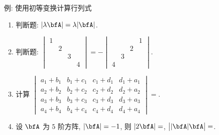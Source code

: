 \begin{frame}{例: 使用初等变换计算行列式}
	\onslide<+->
	\begin{exercise}
		\begin{enumerate}
			\item 判断题: $|\lambda \bfA|=\lambda|\bfA|$. \onslide<+->{\alert{$|\lambda \bfA|=\lambda^n|\bfA|$}}
			\item 判断题: $\begin{vmatrix}
				1&&&\\&2&&\\&&3&\\&&&4
			\end{vmatrix}=-\begin{vmatrix}
				&&&1\\&&2&\\&3&&\\4&&&
			\end{vmatrix}$. \onslide<+->{\alert{$|\bfe_4,\bfe_3,\bfe_2,\bfe_1|=1$}}
			\item 计算 $\begin{vmatrix}
				a_1+b_1&b_1+c_1&c_1+d_1&d_1+a_1\\
				a_2+b_2&b_2+c_2&c_2+d_2&d_2+a_2\\
				a_3+b_3&b_3+c_3&c_3+d_3&d_3+a_3\\
				a_4+b_4&b_4+c_4&c_4+d_4&d_4+a_4
			\end{vmatrix}=$.
			\item 设 $\bfA$ 为 $5$ 阶方阵, $|\bfA|=-1$, 则
				$|2\bfA|=$,
				$\bigl||\bfA|\bfA\bigr|=$.
		\end{enumerate}
	\end{exercise}
\end{frame}


